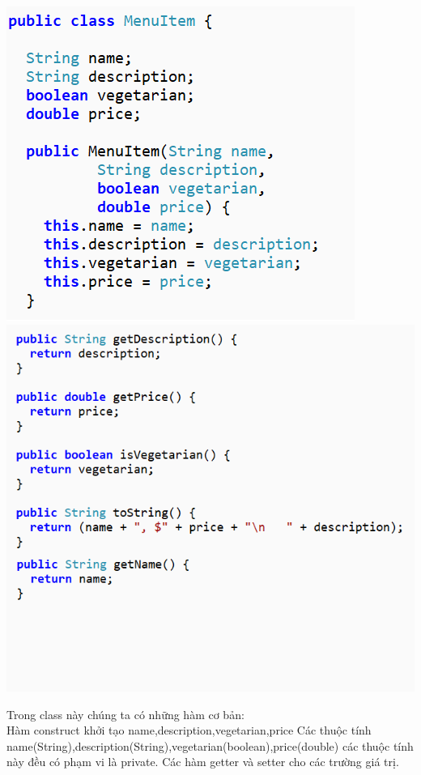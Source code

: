 \begin{multicols}{2}
\includegraphics[width=1\columnwidth]{GALLEYS/images/chapter3/images1}\\
\includegraphics[width=1\columnwidth]{GALLEYS/images/chapter3/images2}
\end{multicols}
Trong class này chúng ta có những hàm cơ bản:\\
Hàm construct khởi tạo name,description,vegetarian,price
Các thuộc tính\\ name(String),description(String),vegetarian(boolean),price(double) các thuộc tính này đều có phạm vi là private.
Các hàm getter và setter cho các trường giá trị.\\

